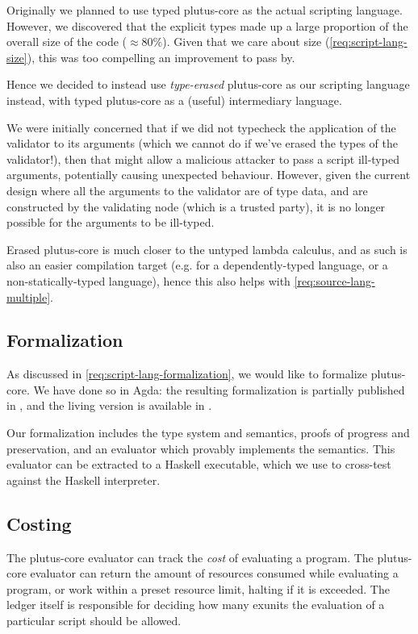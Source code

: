 Originally we planned to use typed \gls{plutus-core} as the actual scripting language.
However, we discovered that the explicit types made up a large proportion of the overall size of the code ($\approx 80\%$).
Given that we care about size (\cref{req:script-lang-size}), this was too compelling an improvement to pass by.

Hence we decided to instead use \emph{type-erased} \gls{plutus-core} as our scripting language instead, with typed \gls{plutus-core} as a (useful) intermediary language.

We were initially concerned that if we did not typecheck the application of the \gls{validator} to its arguments (which we cannot do if we've erased the types of the \gls{validator}!), then that might allow a malicious attacker to pass a script ill-typed arguments, potentially causing unexpected behaviour.
However, given the current design where all the arguments to the \gls{validator} are of type \gls{data}, and are constructed by the validating node (which is a trusted party), it is no longer possible for the arguments to be ill-typed.

Erased \gls{plutus-core} is much closer to the untyped lambda calculus, and as such is also an easier compilation target (e.g. for a dependently-typed language, or a non-statically-typed language), hence this also helps with \cref{req:source-lang-multiple}.

\subsection{Formalization}

As discussed in \cref{req:script-lang-formalization}, we would like to formalize \gls{plutus-core}.
We have done so in Agda: the resulting formalization is partially published in \textcite{chapman2019system}, and the living version is available in \textcite{plutus-repo}.

Our formalization includes the type system and semantics, proofs of progress and preservation, and an evaluator which provably implements the semantics.
This evaluator can be extracted to a Haskell executable, which we use to cross-test against the Haskell interpreter.

\subsection{Costing}
\label{sec:costing}

The \gls{plutus-core} evaluator can track the \emph{cost} of evaluating a program.
The \gls{plutus-core} evaluator can return the amount of resources consumed while evaluating a program, or work within a preset resource limit, halting if it is exceeded.
The ledger itself is responsible for deciding how many \gls{exunits} the evaluation of a particular \gls{script} should be allowed.

